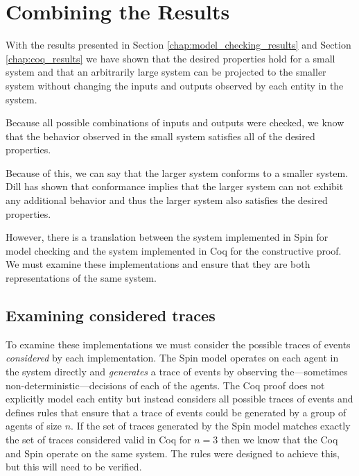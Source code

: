 \documentclass[runningheads]{llncs}
\newif\ifcomments
\newcommand{\egm}[1]{\ifcomments\textcolor{orange}{egm: #1}\fi}
\begin{document}
\section{Combining the Results}
With the results presented in Section \ref{chap:model_checking_results} and Section \ref{chap:coq_results} we have shown that the desired properties hold for a small system and that an arbitrarily large system can be projected to the smaller system without changing the inputs and outputs observed by each entity in the system. 
\egm{Make clear the entities that define the observed behavior that is preserved: originator, two relays, and a referee? Maybe even give the system a name, say \emph{base system}, and refer to it by name for clarity?} 
Because all possible combinations of inputs and outputs were checked, we know that the behavior observed in the small system satisfies all of the desired properties. 

Because of this, we can say that the larger system conforms to a smaller system. Dill has shown that conformance implies that the larger system can not exhibit any additional behavior and thus the larger system also satisfies the desired properties. \cite{dill_trace_theory}

However, there is a translation between the system implemented in Spin for model checking and the system implemented in Coq for the constructive proof. We must examine these implementations and ensure that they are both representations of the same system. 

\subsection{Examining considered traces}
To examine these implementations we must consider the possible traces of events \emph{considered} by each implementation. 
The Spin model operates on each agent in the system directly and \emph{generates} a trace of events by observing the---sometimes non-deterministic---decisions of each of the agents. The Coq proof does not explicitly model each entity but instead considers all possible traces of events and defines rules that ensure that a trace of events could be generated by a group of agents of size $n$. If the set of traces generated by the Spin model matches exactly the set of traces considered valid in Coq for $n=3$ then we know that the Coq and Spin operate on the same system. The rules were designed to achieve this, but this will need to be verified.
\end{document}
